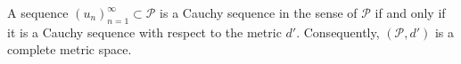 A sequence $(u_n)_{n=1}^{\infty} \subset \mathcal{P}$ is a Cauchy sequence in the sense of $\mathcal{P}$ if and only if it is a Cauchy sequence with respect to the metric $d'$. Consequently, $(\mathcal{P}, d')$ is a complete metric space.
